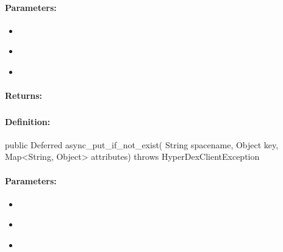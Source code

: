 \paragraph{Parameters:}
\begin{itemize}[noitemsep]
\item {}\\

\item {}\\

\item {}\\

\end{itemize}

\paragraph{Returns:}


\pagebreak
\subsubsection{}
\label{api:java:async_put_if_not_exist}


\paragraph{Definition:}
\begin{javacode}
public Deferred async_put_if_not_exist(
        String spacename,
        Object key,
        Map<String, Object> attributes) throws HyperDexClientException
\end{javacode}

\paragraph{Parameters:}
\begin{itemize}[noitemsep]
\item {}\\

\item {}\\

\item {}\\

\end{itemize}

